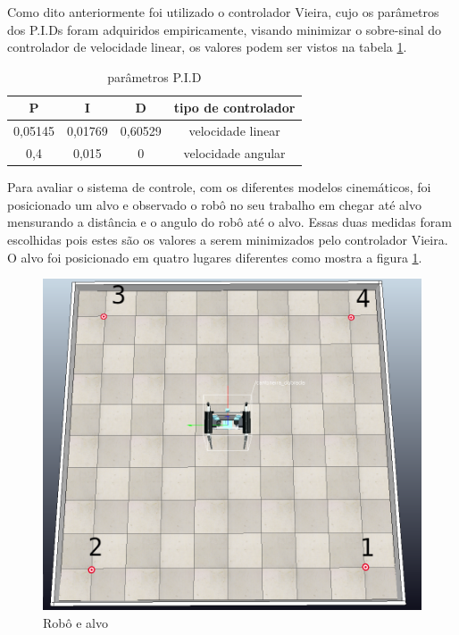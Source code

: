 Como dito anteriormente foi utilizado o controlador Vieira,
cujo os parâmetros dos P.I.Ds foram adquiridos empiricamente,
visando minimizar o sobre-sinal do controlador de velocidade linear,
os valores podem ser vistos na tabela \ref{table:pid:}.

\begin{table}[H]
    \label{table:pid:}
    \centering
    \begin{tabular}{c|c|c|c}
        \hline
        P & I & D & tipo de controlador \\
        \hline
        0,05145 & 0,01769 & 0,60529 & velocidade linear \\
        \hline
        0,4 & 0,015 & 0 & velocidade angular \\
        \hline
    \end{tabular}
    \caption{parâmetros P.I.D}
\end{table}

Para avaliar o sistema de controle, com os diferentes modelos
cinemáticos, foi posicionado um alvo e observado o robô no seu
trabalho em chegar até alvo mensurando a distância e o angulo do robô até
o alvo. Essas duas medidas foram escolhidas pois 
estes são os valores a serem minimizados pelo controlador Vieira.
O alvo foi posicionado em quatro lugares diferentes como mostra a figura
\ref{fig:robo:e:4:alvos}.

\begin{figure}[H]
    \label{fig:robo:e:4:alvos}
    \centering
    \includegraphics[scale=0.3]{figuras/robo_e_alvo.png}
    \caption{Robô e alvo}
\end{figure}

